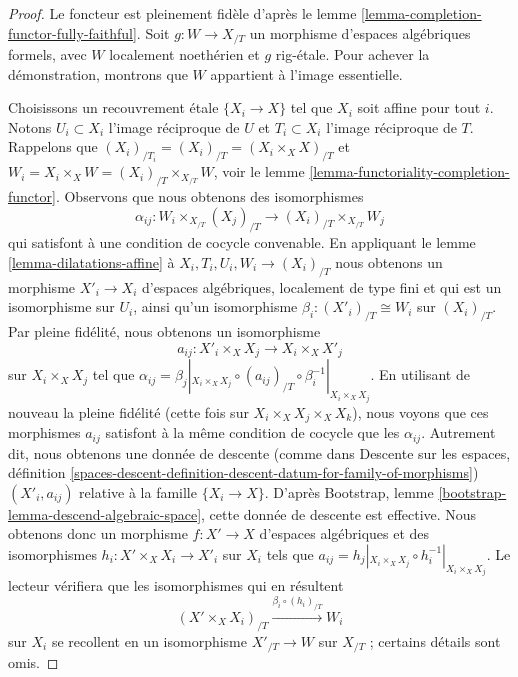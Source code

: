 \begin{proof}
Le foncteur est pleinement fidèle d'après le
lemme \ref{lemma-completion-functor-fully-faithful}.
Soit $g : W \to X_{/T}$ un morphisme d'espaces algébriques formels,
avec $W$ localement noethérien et $g$ rig-étale.
Pour achever la démonstration, montrons que $W$ appartient à l'image essentielle.

\medskip\noindent
Choisissons un recouvrement étale $\{X_i \to X\}$ tel que $X_i$ soit affine
pour tout $i$. Notons $U_i \subset X_i$ l'image réciproque de $U$ et
$T_i \subset X_i$ l'image réciproque de $T$.
Rappelons que $(X_i)_{/T_i} = (X_i)_{/T} = (X_i \times_X X)_{/T}$ et
$W_i = X_i \times_X W = (X_i)_{/T} \times_{X_{/T}} W$, voir
le lemme \ref{lemma-functoriality-completion-functor}.
Observons que nous obtenons des isomorphismes
$$
\alpha_{ij} :
W_i \times_{X_{/T}} (X_j)_{/T}
\longrightarrow 
(X_i)_{/T} \times_{X_{/T}} W_j
$$
qui satisfont à une condition de cocycle convenable.
En appliquant le lemme \ref{lemma-dilatations-affine} à
$X_i, T_i, U_i, W_i \to (X_i)_{/T}$
nous obtenons un morphisme $X'_i \to X_i$ d'espaces algébriques,
localement de type fini et qui est un isomorphisme sur $U_i$,
ainsi qu'un isomorphisme $\beta_i : (X'_i)_{/T} \cong W_i$ sur $(X_i)_{/T}$.
Par pleine fidélité, nous obtenons un isomorphisme
$$
a_{ij} : X'_i \times_X X_j \longrightarrow X_i \times_X X'_j
$$
sur $X_i \times_X X_j$ tel que
$\alpha_{ij} = \beta_j|_{X_i \times_X X_j}
\circ (a_{ij})_{/T} \circ \beta_i^{-1}|_{X_i \times_X X_j}$.
En utilisant de nouveau la pleine fidélité (cette fois sur
$X_i \times_X X_j \times_X X_k$),
nous voyons que ces morphismes $a_{ij}$ satisfont à la même
condition de cocycle que les $\alpha_{ij}$.
Autrement dit, nous obtenons une donnée de descente
(comme dans Descente sur les espaces, définition
\ref{spaces-descent-definition-descent-datum-for-family-of-morphisms})
$(X'_i, a_{ij})$ relative à la famille $\{X_i \to X\}$.
D'après Bootstrap, lemme \ref{bootstrap-lemma-descend-algebraic-space},
cette donnée de descente est effective. Nous obtenons donc un morphisme
$f : X' \to X$ d'espaces algébriques et des isomorphismes
$h_i : X' \times_X X_i \to X'_i$ sur $X_i$ tels que
$a_{ij} = h_j|_{X_i \times_X X_j} \circ h_i^{-1}|_{X_i \times_X X_j}$.
Le lecteur vérifiera que les isomorphismes qui en résultent
$$
(X' \times_X X_i)_{/T}
\xrightarrow{\beta_i \circ (h_i)_{/T}}
W_i
$$
sur $X_i$ se recollent en un isomorphisme $X'_{/T} \to W$
sur $X_{/T}$ ; certains détails sont omis.
\end{proof}









